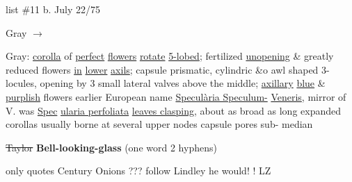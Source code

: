 \documentclass[a4paper]{article}
\begin{document}
\begin{minipage}{0.1\textwidth}
\Circled{\color{blue}{13}} 
\end{minipage}
\begin{minipage}{0.2\textwidth}
\color{blue}
\null list \#11
b. July 22/75
\end{minipage}
\begin{minipage}{0.7\textwidth}
\begin{flushright}
\color{blue}
\par
Gray
$\rightarrow$
\color{red}\Circled{\color{blue}{Venus's Looking-glass}}\par
\end{flushright}
\end{minipage}
\color{blue}
\vspace{0pt}
\begin{minipage}[t]{0.3\textwidth}
\setul{}{2pt}
Gray: \ul{corolla}
of \ul{perfect} \ul{flowers}
\ul{rotate} \ul{5-lobed};
fertilized
\ul{unopening} \&
greatly reduced
flowers \ul{in} \ul{lower}
\ul{axils}; capsule
prismatic, cylindric
\&o awl shaped 3-
locules, opening
by 3 small lateral
valves
above the
middle; \ul{axillary}
\ul{blue} \& \ul{purplish} %
flowers earlier
European name
\setul{}{1pt}
\ul{Specul\`aria Speculum-} 
\ul{Veneris}, mirror of V.
\setul{}{2pt}
was \ul{Spec}
\setul{}{1pt}
\ul{ularia perfoliata}
\setul{}{2pt}
\ul{leaves clasping}, about as
broad as long expanded
corollas usually borne
at several upper nodes
capsule pores sub-
median

\sout{Taylor}
\color{red}
\textbf{Bell-looking-glass}
(one word
2 hyphens)

only
quotes Century
Onions ???
\color{blue}
follow Lindley
he would!
! LZ


\end{minipage}
\hfill
\end{document}
